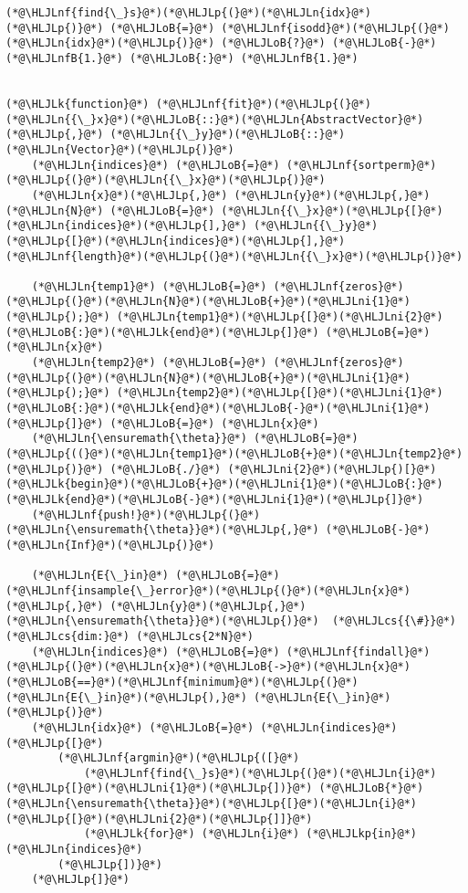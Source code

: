 \documentclass[12pt,a4paper]{article}
\newcommand{\HLJLk}[1]{\textcolor[RGB]{148,91,176}{\textbf{#1}}}
\newcommand{\HLJLkp}[1]{\textcolor[RGB]{148,91,176}{\textbf{#1}}}
\newcommand{\HLJLn}[1]{#1}
\newcommand{\HLJLnf}[1]{\textcolor[RGB]{66,102,213}{#1}}
\newcommand{\HLJLnfB}[1]{\textcolor[RGB]{59,151,46}{#1}}
\newcommand{\HLJLni}[1]{\textcolor[RGB]{59,151,46}{#1}}
\newcommand{\HLJLoB}[1]{\textcolor[RGB]{102,102,102}{\textbf{#1}}}
\newcommand{\HLJLp}[1]{#1}
\newcommand{\HLJLcs}[1]{\textcolor[RGB]{153,153,119}{\textit{#1}}}
\begin{document}
\begin{lstlisting}
(*@\HLJLnf{find{\_}s}@*)(*@\HLJLp{(}@*)(*@\HLJLn{idx}@*)(*@\HLJLp{)}@*) (*@\HLJLoB{=}@*) (*@\HLJLnf{isodd}@*)(*@\HLJLp{(}@*)(*@\HLJLn{idx}@*)(*@\HLJLp{)}@*) (*@\HLJLoB{?}@*) (*@\HLJLoB{-}@*)(*@\HLJLnfB{1.}@*) (*@\HLJLoB{:}@*) (*@\HLJLnfB{1.}@*)


(*@\HLJLk{function}@*) (*@\HLJLnf{fit}@*)(*@\HLJLp{(}@*)(*@\HLJLn{{\_}x}@*)(*@\HLJLoB{::}@*)(*@\HLJLn{AbstractVector}@*)(*@\HLJLp{,}@*) (*@\HLJLn{{\_}y}@*)(*@\HLJLoB{::}@*)(*@\HLJLn{Vector}@*)(*@\HLJLp{)}@*)
    (*@\HLJLn{indices}@*) (*@\HLJLoB{=}@*) (*@\HLJLnf{sortperm}@*)(*@\HLJLp{(}@*)(*@\HLJLn{{\_}x}@*)(*@\HLJLp{)}@*)
    (*@\HLJLn{x}@*)(*@\HLJLp{,}@*) (*@\HLJLn{y}@*)(*@\HLJLp{,}@*) (*@\HLJLn{N}@*) (*@\HLJLoB{=}@*) (*@\HLJLn{{\_}x}@*)(*@\HLJLp{[}@*)(*@\HLJLn{indices}@*)(*@\HLJLp{],}@*) (*@\HLJLn{{\_}y}@*)(*@\HLJLp{[}@*)(*@\HLJLn{indices}@*)(*@\HLJLp{],}@*) (*@\HLJLnf{length}@*)(*@\HLJLp{(}@*)(*@\HLJLn{{\_}x}@*)(*@\HLJLp{)}@*)

    (*@\HLJLn{temp1}@*) (*@\HLJLoB{=}@*) (*@\HLJLnf{zeros}@*)(*@\HLJLp{(}@*)(*@\HLJLn{N}@*)(*@\HLJLoB{+}@*)(*@\HLJLni{1}@*)(*@\HLJLp{);}@*) (*@\HLJLn{temp1}@*)(*@\HLJLp{[}@*)(*@\HLJLni{2}@*)(*@\HLJLoB{:}@*)(*@\HLJLk{end}@*)(*@\HLJLp{]}@*) (*@\HLJLoB{=}@*) (*@\HLJLn{x}@*)
    (*@\HLJLn{temp2}@*) (*@\HLJLoB{=}@*) (*@\HLJLnf{zeros}@*)(*@\HLJLp{(}@*)(*@\HLJLn{N}@*)(*@\HLJLoB{+}@*)(*@\HLJLni{1}@*)(*@\HLJLp{);}@*) (*@\HLJLn{temp2}@*)(*@\HLJLp{[}@*)(*@\HLJLni{1}@*)(*@\HLJLoB{:}@*)(*@\HLJLk{end}@*)(*@\HLJLoB{-}@*)(*@\HLJLni{1}@*)(*@\HLJLp{]}@*) (*@\HLJLoB{=}@*) (*@\HLJLn{x}@*)
    (*@\HLJLn{\ensuremath{\theta}}@*) (*@\HLJLoB{=}@*) (*@\HLJLp{((}@*)(*@\HLJLn{temp1}@*)(*@\HLJLoB{+}@*)(*@\HLJLn{temp2}@*)(*@\HLJLp{)}@*) (*@\HLJLoB{./}@*) (*@\HLJLni{2}@*)(*@\HLJLp{)[}@*)(*@\HLJLk{begin}@*)(*@\HLJLoB{+}@*)(*@\HLJLni{1}@*)(*@\HLJLoB{:}@*)(*@\HLJLk{end}@*)(*@\HLJLoB{-}@*)(*@\HLJLni{1}@*)(*@\HLJLp{]}@*)
    (*@\HLJLnf{push!}@*)(*@\HLJLp{(}@*)(*@\HLJLn{\ensuremath{\theta}}@*)(*@\HLJLp{,}@*) (*@\HLJLoB{-}@*)(*@\HLJLn{Inf}@*)(*@\HLJLp{)}@*)

    (*@\HLJLn{E{\_}in}@*) (*@\HLJLoB{=}@*) (*@\HLJLnf{insample{\_}error}@*)(*@\HLJLp{(}@*)(*@\HLJLn{x}@*)(*@\HLJLp{,}@*) (*@\HLJLn{y}@*)(*@\HLJLp{,}@*) (*@\HLJLn{\ensuremath{\theta}}@*)(*@\HLJLp{)}@*)  (*@\HLJLcs{{\#}}@*) (*@\HLJLcs{dim:}@*) (*@\HLJLcs{2*N}@*)
    (*@\HLJLn{indices}@*) (*@\HLJLoB{=}@*) (*@\HLJLnf{findall}@*)(*@\HLJLp{(}@*)(*@\HLJLn{x}@*)(*@\HLJLoB{->}@*)(*@\HLJLn{x}@*)(*@\HLJLoB{==}@*)(*@\HLJLnf{minimum}@*)(*@\HLJLp{(}@*)(*@\HLJLn{E{\_}in}@*)(*@\HLJLp{),}@*) (*@\HLJLn{E{\_}in}@*)(*@\HLJLp{)}@*)
    (*@\HLJLn{idx}@*) (*@\HLJLoB{=}@*) (*@\HLJLn{indices}@*)(*@\HLJLp{[}@*)
        (*@\HLJLnf{argmin}@*)(*@\HLJLp{([}@*)
            (*@\HLJLnf{find{\_}s}@*)(*@\HLJLp{(}@*)(*@\HLJLn{i}@*)(*@\HLJLp{[}@*)(*@\HLJLni{1}@*)(*@\HLJLp{])}@*) (*@\HLJLoB{*}@*) (*@\HLJLn{\ensuremath{\theta}}@*)(*@\HLJLp{[}@*)(*@\HLJLn{i}@*)(*@\HLJLp{[}@*)(*@\HLJLni{2}@*)(*@\HLJLp{]]}@*) 
            (*@\HLJLk{for}@*) (*@\HLJLn{i}@*) (*@\HLJLkp{in}@*) (*@\HLJLn{indices}@*)
        (*@\HLJLp{])}@*)
    (*@\HLJLp{]}@*)


\end{lstlisting}
\end{document}
